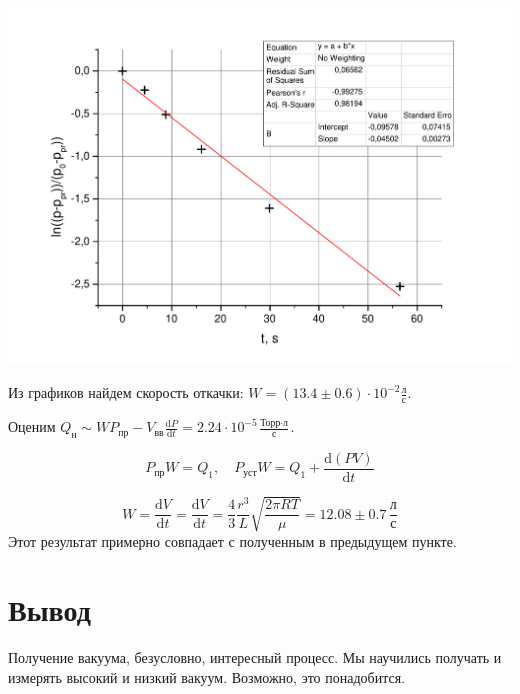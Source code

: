 \documentclass[a4paper,12pt]{article}
\newcommand{\dif}{\mathrm{d}}
\begin{document}
	\includegraphics[width = 0.8\linewidth]{graph_3}
	
	Из графиков найдем скорость откачки: $ W = (13.4\pm 0.6)\cdot 10^{-2} \frac{\text{л}}{\text{с}}$.
	
	Оценим $Q_{\text{н}} \sim WP_{\text{пр}} - V_{\text{вв}}\frac{\dif P}{\dif t} =2.24 \cdot 10^{-5} \frac{\text{Торр}\cdot\text{л}}{\text{с}}$.
	
	
	\[
	P_{\text{пр}}W = Q_1, \quad P_{\text{уст}}W = Q_1 + \frac{\dif(PV)}{\dif t}
	\]
	
	\[
	W = \frac{\dif V}{\dif t} = \frac{\dif V}{\dif t} = \frac{4}{3}\frac{r^3}{L}\sqrt{\frac{2\pi RT}{\mu}} = 12.08 \pm 0.7 \, \frac{\text{л}}{\text{с}}
	\]
	Этот результат примерно совпадает с полученным в предыдущем пункте. 
	\section{Вывод}
		Получение вакуума, безусловно, интересный процесс. Мы научились получать и измерять высокий и низкий вакуум. Возможно, это понадобится.
\end{document}
